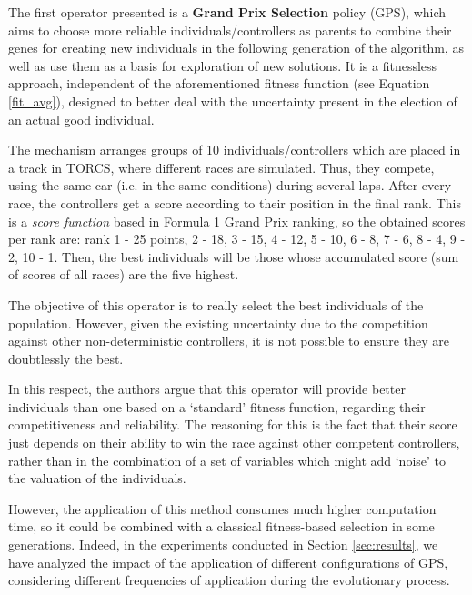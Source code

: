 \documentclass[10pt,journal,compsoc]{IEEEtran}
\begin{document}

The first operator presented is a \textbf{Grand Prix Selection} policy
(GPS), which aims to choose more reliable individuals/controllers as
parents to combine their genes for creating new individuals in the
following generation of the algorithm, as well as use them as a basis
for exploration of new solutions. It is a fitnessless approach,
independent of the aforementioned fitness function (see Equation
\ref{fit_avg}), designed to better deal with the uncertainty present
in the election of an actual good individual. 

The mechanism arranges groups of 10 individuals/controllers which are placed in a track in TORCS, where different races are simulated. Thus, they compete, using the same car (i.e. in the same conditions) during several laps. After every race, the controllers get a score according to their position in the final rank. This is a \textit{score function} based in Formula 1 Grand Prix ranking, so the obtained scores per rank are: rank 1 - 25 points, 2 - 18, 3 - 15, 4 - 12, 5 - 10, 6 - 8, 7 - 6, 8 - 4, 9 - 2, 10 - 1.
Then, the best individuals will be those whose accumulated score (sum of scores of all races) are the five highest.

The objective of this operator is to really select the best individuals of the population. However, given the existing uncertainty \cite{merelo2016statistical} due to the competition against other non-deterministic controllers, it is not possible to ensure they are doubtlessly the best.

In this respect, the authors argue that this operator will provide better individuals than one based on a `standard' fitness function, regarding their competitiveness and reliability. The reasoning for this is the fact that their score just depends on their ability to win the race against other competent controllers, rather than in the combination of a set of variables which might add `noise' to the valuation of the individuals.

However, the application of this method consumes much higher computation time, so it could be combined with a classical fitness-based selection in some generations. Indeed, in the experiments conducted in Section \ref{sec:results}, we have analyzed the impact of the application of different configurations of GPS, considering different frequencies of application during the evolutionary process.
\end{document}
